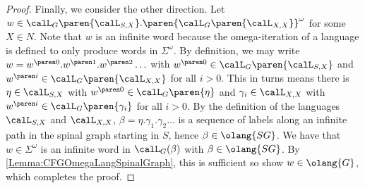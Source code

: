 \documentclass[../../diss.tex]{subfiles}
\begin{document}
\begin{proof}
    Finally, we consider the other direction.
    Let $w \in \calL_G\paren{\calL_{S,X}}.\paren{\calL_G\paren{\calL_{X,X}}}^\omega$ for some $X \in N$.
    Note that $w$ is an infinite word because the omega-iteration of a language is defined to only produce words in $\Sigma^\omega$.
    By definition, we may write $w = \itr{w}{0}.\itr{w}{1}.\itr{w}{2}\ldots$ with $\itr{w}{0} \in \calL_G\paren{\calL_{S,X}}$ and $\itr{w}{i} \in \calL_G\paren{\calL_{X,X}}$ for all $i > 0$.
    This in turns means there is $\eta \in \calL_{S,X}$ with $\itr{w}{0} \in \calL_G\paren{\eta}$ and $\gamma_i \in \calL_{X,X}$ with $\itr{w}{i} \in \calL_G\paren{\gamma_i}$ for all $i > 0$.
    By the definition of the languages $\calL_{S,X}$ and $\calL_{X,X}$, $\beta = \eta.\gamma_1.\gamma_2\ldots$ is a sequence of labels along an infinite path in the spinal graph starting in $S$, hence $\beta \in \olang{\SpinalGraph}$.
    We have that $w \in \Sigma^\omega$ is an infinite word in $\calL_G(\beta)$ with $\beta \in \olang{\SpinalGraph}$.
    By \cref{Lemma:CFGOmegaLangSpinalGraph}, this is sufficient so show $w \in \olang{G}$, which completes the proof.
\end{proof}
\end{document}

